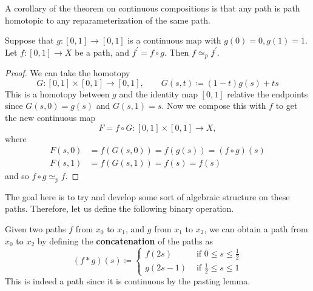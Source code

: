   A corollary of the theorem on continuous compositions is that any path is path homotopic to any reparameterization of the same path. 

  \begin{corollary}
    Suppose that $g: [0, 1] \to [0, 1]$ is a continuous map with $g(0) = 0, g(1) = 1$. Let $f: [0, 1] \to X$ be a path, and $f^\prime = f \circ g$. Then $f \simeq_p f^\prime$. 
  \end{corollary}
  \begin{proof}
    We can take the homotopy 
    \begin{equation}
      G: [0, 1] \times [0, 1] \to [0, 1], \qquad G(s, t) \coloneqq (1 - t) g(s) + t s 
    \end{equation}
    This is a homotopy between $g$ and the identity map $[0, 1]$ relative the endpoints since $G(s, 0) = g(s)$ and $G(s, 1) = s$. Now we compose this with $f$ to get the new continuous map  
    \begin{equation}
      F = f \circ G: [0, 1] \times [0, 1] \to X, 
    \end{equation}
    where 
    \begin{align}
      F(s, 0) & = f(G(s, 0)) = f(g(s)) = (f \circ g)(s) \\ 
      F(s, 1) & = f(G(s, 1)) = f(s) = f(s)
    \end{align} 
    and so $f \circ g \simeq_p f$. 
  \end{proof}

  The goal here is to try and develop some sort of algebraic structure on these paths. Therefore, let us define the following binary operation.  

  \begin{definition}
    Given two paths $f$ from $x_0$ to $x_1$, and $g$ from $x_1$ to $x_2$, we can obtain a path from $x_0$ to $x_2$ by defining the \textbf{concatenation} of the paths as 
    \begin{equation}
      (f \ast g) (s) \coloneqq \begin{cases} 
        f(2s) & \text{ if } 0 \leq s \leq \frac{1}{2} \\ 
        g(2s - 1) & \text{ if } \frac{1}{2} \leq s \leq 1
      \end{cases}
    \end{equation}
    This is indeed a path since it is continuous by the pasting lemma. 
  \end{definition}

